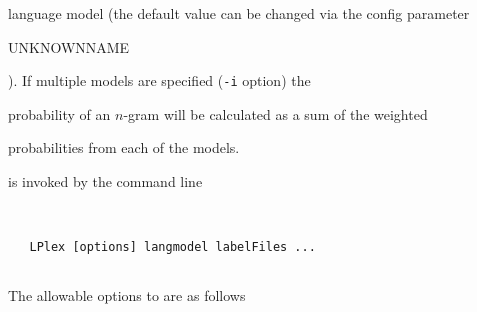 language model (the default value can be changed via the config parameter {\tt


UNKNOWNNAME}). If multiple models are specified ({\tt -i} option) the


probability of an $n$-gram will be calculated as a sum of the weighted


probabilities from each of the models.










 is invoked by the command line


\begin{verbatim}


   LPlex [options] langmodel labelFiles ...


\end{verbatim}





The allowable options to  are as follows


